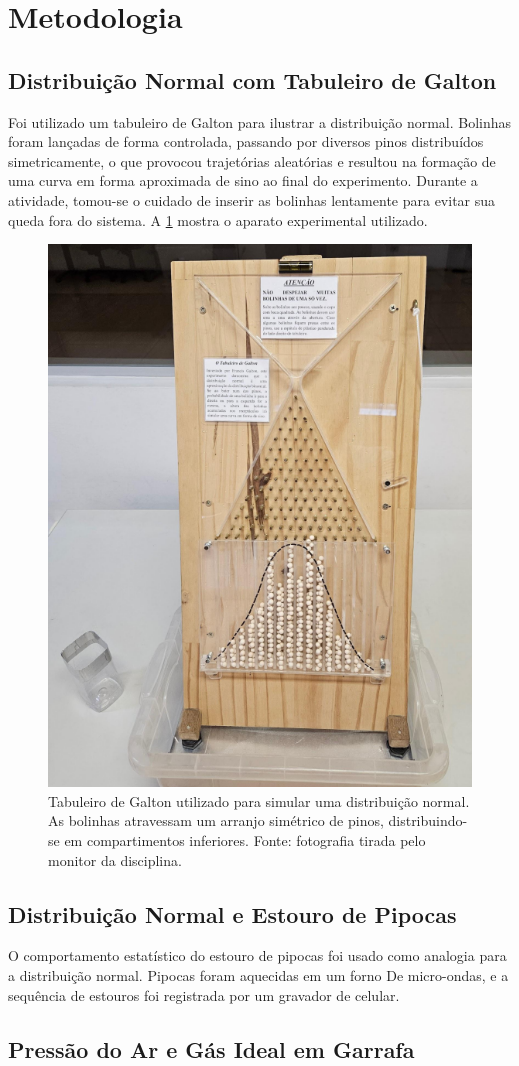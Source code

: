 \section{Metodologia}

\subsection{Distribuição Normal com Tabuleiro de Galton}

Foi utilizado um tabuleiro de Galton para ilustrar a distribuição normal. Bolinhas foram lançadas de forma controlada, passando por diversos pinos distribuídos simetricamente, o que provocou trajetórias aleatórias e resultou na formação de uma curva em forma aproximada de sino ao final do experimento. Durante a atividade, tomou-se o cuidado de inserir as bolinhas lentamente para evitar sua queda fora do sistema. A \cref{fig:galton} mostra o aparato experimental utilizado.

\begin{figure}[H]
\centering
\includegraphics[width=0.35\linewidth]{fig/galton.png}
\caption{Tabuleiro de Galton utilizado para simular uma distribuição normal. As bolinhas atravessam um arranjo simétrico de pinos, distribuindo-se em compartimentos inferiores. Fonte: fotografia tirada pelo monitor da disciplina.}
\label{fig:galton}
\end{figure}

\subsection{Distribuição Normal e Estouro de Pipocas}

O comportamento estatístico do estouro de pipocas foi usado como analogia para a distribuição normal. Pipocas foram aquecidas em um forno De micro-ondas, e a sequência de estouros foi registrada por um gravador de celular. 

\subsection{Pressão do Ar e Gás Ideal em Garrafa}

